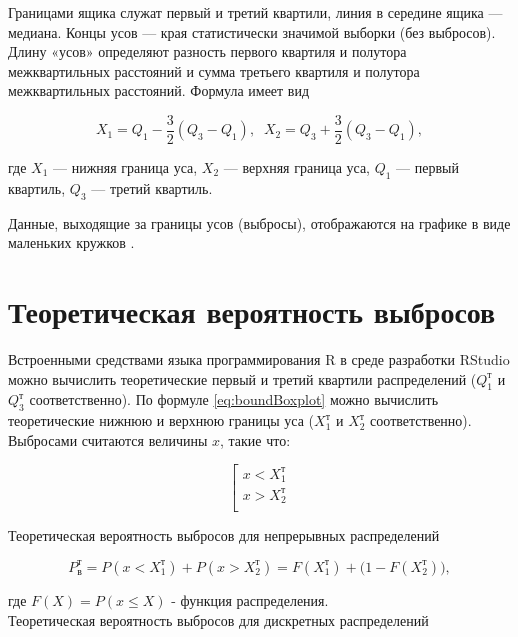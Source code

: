 \documentclass{article}
\begin{document}
Границами ящика служат первый и третий квартили, линия в середине ящика --- медиана. Концы усов --- края статистически значимой выборки (без выбросов). Длину «усов» определяют разность первого квартиля и полутора межквартильных расстояний и сумма третьего квартиля и полутора межквартильных расстояний. Формула имеет вид

\begin{equation} \label{eq:boundBoxplot}
    X_1 = Q_1 - \dfrac{3}{2}(Q_3 - Q_1), \;\; X_2 = Q_3 + \dfrac{3}{2}(Q_3 - Q_1),
\end{equation}

где $X_1$ --- нижняя граница уса, $X_2$ --- верхняя граница уса, $Q_1$ --- первый квартиль, $Q_3$ --- третий квартиль.

Данные, выходящие за границы усов (выбросы), отображаются на графике в виде маленьких кружков \cite{s:boxplot}.

\section{Теоретическая вероятность выбросов}

Встроенными средствами языка программирования R в среде разработки RStudio можно вычислить теоретические первый и третий квартили распределений ($Q_1^\text{т}$ и $Q_3^\text{т}$ соответственно). По формуле \eqref{eq:boundBoxplot} можно вычислить теоретические нижнюю и верхнюю границы уса ($X_1^\text{т}$ и $X_2^\text{т}$ соответственно). Выбросами считаются величины $x$, такие что:

\begin{equation}
    \left[ 
        \begin{gathered} 
            x < X_1^\text{т}\\ 
            x > X_2^\text{т}\\ 
        \end{gathered} 
    \right.
\end{equation}

Теоретическая вероятность выбросов для непрерывных распределений

\begin{equation} \label{eq:probTheorCont}
    P_\text{в}^\text{т} = P(x < X_1^\text{т}) + P(x > X_2^\text{т}) = F(X_1^\text{т}) + \Big(1 - F(X_2^\text{т})\Big),
\end{equation}

где $F(X) = P(x \le X)$ - функция распределения.\\
    
Теоретическая вероятность выбросов для дискретных распределений
\end{document}
